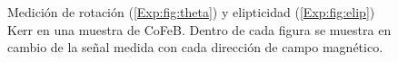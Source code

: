 \documentclass[paper=letter, fontsize=12pt]{scrartcl}
\numberwithin{equation}{section}		%
\numberwithin{figure}{section}			%
\numberwithin{table}{section}				%
\begin{document}
\begin{figure}[!hbt]
	\centering
	\caption[Hit\'eresis de $\theta_k$ y $\eta_k$ en CoFeB]{Medici\'on de rotaci\'on (\ref{Exp:fig:theta}) y elipticidad (\ref{Exp:fig:elip}) Kerr en una muestra de CoFeB. Dentro de cada figura se muestra en cambio de la se\~nal medida con cada direcci\'on de campo magn\'etico.}
	\label{Exp:fig:Kerrhis}
	
\end{figure}
\end{document}
